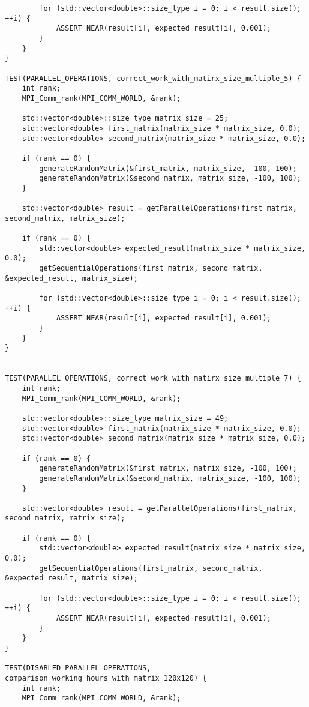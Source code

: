 \documentclass{report}
\begin{document}
\begin{lstlisting}
        for (std::vector<double>::size_type i = 0; i < result.size(); ++i) {
            ASSERT_NEAR(result[i], expected_result[i], 0.001);
        }
    }
}

TEST(PARALLEL_OPERATIONS, correct_work_with_matirx_size_multiple_5) {
    int rank;
    MPI_Comm_rank(MPI_COMM_WORLD, &rank);

    std::vector<double>::size_type matrix_size = 25;
    std::vector<double> first_matrix(matrix_size * matrix_size, 0.0);
    std::vector<double> second_matrix(matrix_size * matrix_size, 0.0);

    if (rank == 0) {
        generateRandomMatrix(&first_matrix, matrix_size, -100, 100);
        generateRandomMatrix(&second_matrix, matrix_size, -100, 100);
    }

    std::vector<double> result = getParallelOperations(first_matrix, second_matrix, matrix_size);

    if (rank == 0) {
        std::vector<double> expected_result(matrix_size * matrix_size, 0.0);
        getSequentialOperations(first_matrix, second_matrix, &expected_result, matrix_size);

        for (std::vector<double>::size_type i = 0; i < result.size(); ++i) {
            ASSERT_NEAR(result[i], expected_result[i], 0.001);
        }
    }
}


TEST(PARALLEL_OPERATIONS, correct_work_with_matirx_size_multiple_7) {
    int rank;
    MPI_Comm_rank(MPI_COMM_WORLD, &rank);

    std::vector<double>::size_type matrix_size = 49;
    std::vector<double> first_matrix(matrix_size * matrix_size, 0.0);
    std::vector<double> second_matrix(matrix_size * matrix_size, 0.0);

    if (rank == 0) {
        generateRandomMatrix(&first_matrix, matrix_size, -100, 100);
        generateRandomMatrix(&second_matrix, matrix_size, -100, 100);
    }

    std::vector<double> result = getParallelOperations(first_matrix, second_matrix, matrix_size);

    if (rank == 0) {
        std::vector<double> expected_result(matrix_size * matrix_size, 0.0);
        getSequentialOperations(first_matrix, second_matrix, &expected_result, matrix_size);

        for (std::vector<double>::size_type i = 0; i < result.size(); ++i) {
            ASSERT_NEAR(result[i], expected_result[i], 0.001);
        }
    }
}

TEST(DISABLED_PARALLEL_OPERATIONS, comparison_working_hours_with_matrix_120x120) {
    int rank;
    MPI_Comm_rank(MPI_COMM_WORLD, &rank);


\end{lstlisting}
\end{document}
